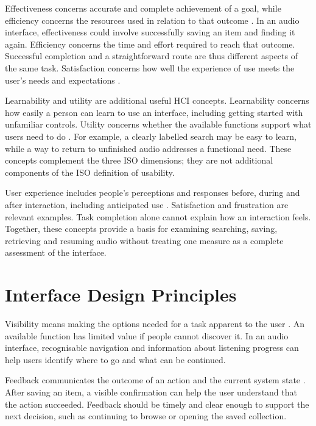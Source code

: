 Effectiveness concerns accurate and complete achievement of a goal, while
efficiency concerns the resources used in relation to that outcome
\cite[Secs.~3.1.7--3.1.8]{isocif2023}. In an audio interface,
effectiveness could involve successfully saving an item and finding it again.
Efficiency concerns the time and effort required to reach that outcome.
Successful completion and a straightforward route are thus different aspects
of the same task. Satisfaction concerns how well the experience of use meets
the user's needs and expectations \cite[Sec.~3.1.9]{isocif2023}.

Learnability and utility are additional useful HCI concepts. Learnability
concerns how easily a person can learn to use an interface, including getting
started with unfamiliar controls. Utility concerns whether the available
functions support what users need to do \cite[p.~21]{interactiondesign2023}.
For example, a clearly labelled search may be easy to learn, while a way to
return to unfinished audio addresses a functional need. These concepts
complement the three ISO dimensions; they are not additional components of
the ISO definition of usability.

User experience includes people's perceptions and responses before, during
and after interaction, including anticipated use
\cite[Sec.~3.1.15]{isocif2023}. Satisfaction and frustration are relevant
examples. Task completion alone cannot explain how an interaction feels.
Together, these concepts provide a basis for examining searching, saving,
retrieving and resuming audio without treating one measure as a complete
assessment of the interface.

\section{Interface Design Principles}
\label{sec:interface-principles}

Visibility means making the options needed for a task apparent to the user
\cite[p.~28]{interactiondesign2023}. An available function has limited value
if people cannot discover it. In an audio interface, recognisable navigation
and information about listening progress can help users identify where to
go and what can be continued.

Feedback communicates the outcome of an action and the current system state
\cite[Sec.~1]{nielsenheuristics}. After saving an item, a visible confirmation
can help the user understand that the action succeeded. Feedback should be
timely and clear enough to support the next decision, such as continuing to
browse or opening the saved collection.

